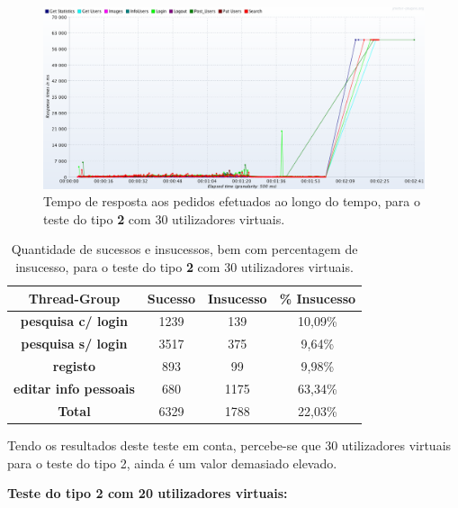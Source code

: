 \begin{figure}[H]
    \centering
    \includegraphics[width=1\textwidth]{images/Testes/3PC_RU_30R.png}
    \caption{Tempo de resposta aos pedidos efetuados ao longo do tempo, para o teste do tipo \textbf{2} com 30 utilizadores virtuais.}
    \label{fig:3PC_RU_30_response}
\end{figure}

\begin{table}[H]
\centering
\caption{Quantidade de sucessos e insucessos, bem com percentagem de insucesso, para o teste do tipo \textbf{2} com 30 utilizadores virtuais.}
\begin{tabular}{cccc}
\hline
\rowcolor[HTML]{EFEFEF} 
\textbf{Thread-Group}                  & \textbf{Sucesso} & \textbf{Insucesso} & \textbf{\% Insucesso} \\ \hline
\textbf{pesquisa c/ login}             & 1239             & 139                & 10,09\%               \\
\textbf{pesquisa s/ login}             & 3517             & 375                & 9,64\%                \\
\textbf{registo}                       & 893              & 99                 & 9,98\%                \\
\textbf{editar info pessoais}          & 680              & 1175               & 63,34\%               \\ \hline
\cellcolor[HTML]{EFEFEF}\textbf{Total} & 6329             & 1788               & 22,03\%               \\ \hline
\end{tabular}
\end{table}

Tendo os resultados deste teste em conta, percebe-se que 30 utilizadores virtuais para o teste do tipo 2, ainda é um valor demasiado elevado.

\vspace{0.5cm}
\noindent\textbf{Teste do tipo 2 com 20 utilizadores virtuais:}

